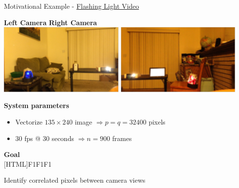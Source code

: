 \documentclass[8pt]{beamer}
\begin{document}
\begin{frame}{Motivational Example -
    \href{run:/home/asendorf/Documents/thesis_videos/flashing_setup.mp4}{Flashing Light Video}}

  \begin{center}\textbf{Left Camera} \hspace{20ex} \textbf{Right Camera}\\
    \includegraphics[width=0.47\textwidth]{figures/flashing_left.png}\hspace{2ex}
    \includegraphics[width=0.47\textwidth]{figures/flashing_right.png}
  \end{center}

  \vspace{2ex}

  \textbf{System parameters}
  \begin{itemize}
  \item Vectorize $135\times 240$ image $\Rightarrow p=q=32400$ pixels
  \item 30 fps @ 30 seconds $\Rightarrow n=900$ frames
  \end{itemize}

  \begin{center}
  \textbf{Goal}\\
  [HTML]{F1F1F1}{\parbox{0.4\textwidth}{%
      \centering
      Identify correlated pixels between camera views
}}
\end{center}
  

\end{frame}
\end{document}
